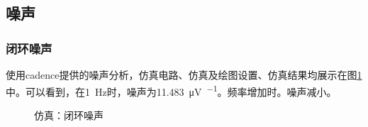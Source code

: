 \documentclass[UTF8]{ctexart}
\numberwithin{figure}{subsection}
\numberwithin{table}{subsection}
\numberwithin{equation}{subsection}
\begin{document}
\subsection{噪声}
\subsubsection{闭环噪声}
使用cadence提供的噪声分析，仿真电路、仿真及绘图设置、仿真结果均展示在图\ref{noise simulation closed}中。可以看到，在\SI[]{1}{\hertz}时，噪声为\SI[]{11.483}{\micro\volt\per{\sqrt{\hertz}}}。频率增加时。噪声减小。

\begin{figure}[H]
    \centering
    \caption{仿真：闭环噪声}
    \label{noise simulation closed}
\end{figure}
\end{document}
